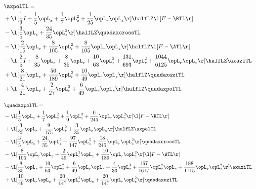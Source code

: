 \begin{alignat}{2} 
\label{eq:linaxpolTL_1} 
& \axpolTL = \\ 
& + \l[ \frac{1}{3} I + \frac{1}{5} \opL_z + \frac{1}{7} \opL_z^{2} + \frac{1}{25} \opL_r \opL_z  \r] \halfLZ \l[ F - \RTL \r] \nonumber \\ 
& - \l[ \frac{3}{5} \opL_z + \frac{24}{35} \opL_z^{2}  \r] \halfLZ \quadaxcrossTL \nonumber \\ 
& - \l[ \frac{2}{15} \opL_r + \frac{8}{105} \opL_r^{2} + \frac{8}{105} \opL_r \opL_z  \r] \halfLZ \l[ F - \ATL \r] \nonumber \\ 
& - \l[ \frac{2}{5} I + \frac{8}{35} \opL_z + \frac{8}{35} \opL_r + \frac{10}{63} \opL_z^{2} + \frac{131}{693} \opL_r^{2} + \frac{1044}{6125} \opL_r \opL_z  \r] \halfLZ \axaziTL \nonumber \\ 
& + \l[ \frac{8}{21} \opL_r + \frac{50}{189} \opL_r^{2} + \frac{10}{49} \opL_r \opL_z  \r] \halfLZ \quadaxaziTL \nonumber \\ 
& + \l[ \frac{4}{21} \opL_r + \frac{2}{27} \opL_r^{2} + \frac{6}{49} \opL_r \opL_z  \r] \halfLZ \quadaxpolTL \nonumber \\ 
\end{alignat} 


\begin{alignat}{2} 
\label{eq:quadaxpolTL_1} 
& \quadaxpolTL = \\ 
& - \l[ \frac{1}{5} \opL_z + \frac{1}{7} \opL_z^{2} + \frac{1}{9} \opL_z^{3} + \frac{6}{245} \opL_r \opL_z^{2}  \r] \l[ F - \RTL \r] \nonumber \\ 
& + \l[ \frac{3}{25} \opL_r + \frac{9}{175} \opL_r^{2} + \frac{3}{35} \opL_r \opL_z  \r] \halfLZ \axpolTL \nonumber \\ 
& - \l[ \frac{3}{5} \opL_z + \frac{24}{35} \opL_z^{2} + \frac{97}{147} \opL_z^{3} + \frac{18}{245} \opL_r \opL_z^{2}  \r] \quadaxcrossTL \nonumber \\ 
& - \l[ \frac{8}{105} \opL_r \opL_z + \frac{2}{49} \opL_r^{2} \opL_z + \frac{10}{189} \opL_r \opL_z^{2}  \r] \l[ F - \ATL \r] \nonumber \\ 
& - \l[ \frac{8}{35} \opL_z + \frac{10}{63} \opL_z^{2} + \frac{6}{49} \opL_r \opL_z + \frac{4}{33} \opL_z^{3} + \frac{167}{1617} \opL_r^{2} \opL_z + \frac{188}{1715} \opL_r \opL_z^{2}  \r] \axaziTL \nonumber \\ 
& + \l[ \frac{10}{49} \opL_r \opL_z + \frac{20}{147} \opL_r^{2} \opL_z + \frac{20}{147} \opL_r \opL_z^{2}  \r] \quadaxaziTL \nonumber \\ 
\end{alignat} 


